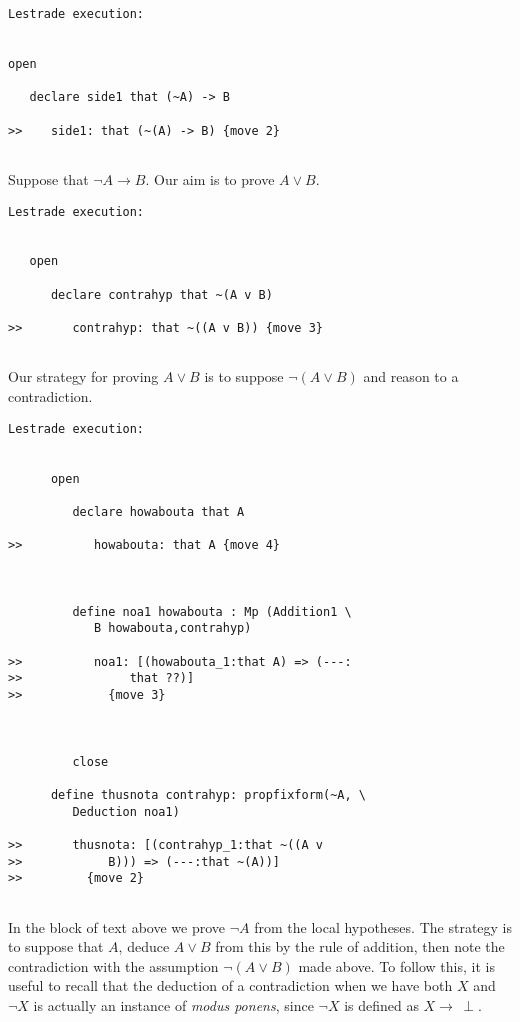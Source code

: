 \documentclass[12pt]{article}
\begin{document}
\begin{verbatim}Lestrade execution:


open

   declare side1 that (~A) -> B

>>    side1: that (~(A) -> B) {move 2}


\end{verbatim}

Suppose that $\neg A \rightarrow B$.  Our aim is to prove $A \vee B$.

\begin{verbatim}Lestrade execution:


   open

      declare contrahyp that ~(A v B)

>>       contrahyp: that ~((A v B)) {move 3}


\end{verbatim}

Our strategy for proving $A \vee B$ is to suppose $\neg(A \vee B)$ and reason to a contradiction.

\begin{verbatim}Lestrade execution:


      open

         declare howabouta that A

>>          howabouta: that A {move 4}



         define noa1 howabouta : Mp (Addition1 \
            B howabouta,contrahyp)

>>          noa1: [(howabouta_1:that A) => (---:
>>               that ??)]
>>            {move 3}



         close

      define thusnota contrahyp: propfixform(~A, \
         Deduction noa1)

>>       thusnota: [(contrahyp_1:that ~((A v
>>            B))) => (---:that ~(A))]
>>         {move 2}


\end{verbatim}

In the block of text above we prove $\neg A$ from the local hypotheses.  The strategy is to suppose that $A$, deduce $A \vee B$ from this by 
the rule of addition, then note the contradiction with the assumption $\neg (A \vee B)$ made above.  To follow this, it is useful to recall that the 
deduction of a contradiction when we have both $X$ and $\neg X$ is actually an instance of {\em modus ponens\/}, since $\neg X$ is defined
as $X \rightarrow \,\perp$.
\end{document}
